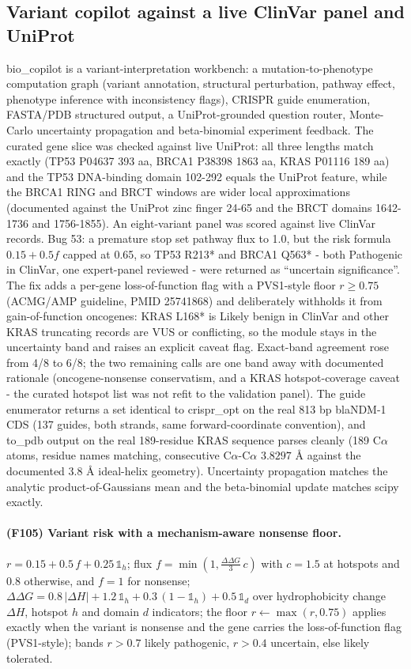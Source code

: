 \subsection{Variant copilot against a live ClinVar panel and UniProt}
bio\_copilot is a variant-interpretation workbench: a mutation-to-phenotype computation graph (variant annotation, structural perturbation, pathway effect, phenotype inference with inconsistency flags), CRISPR guide enumeration, FASTA/PDB structured output, a UniProt-grounded question router, Monte-Carlo uncertainty propagation and beta-binomial experiment feedback. The curated gene slice was checked against live UniProt: all three lengths match exactly (TP53 P04637 393 aa, BRCA1 P38398 1863 aa, KRAS P01116 189 aa) and the TP53 DNA-binding domain 102-292 equals the UniProt feature, while the BRCA1 RING and BRCT windows are wider local approximations (documented against the UniProt zinc finger 24-65 and the BRCT domains 1642-1736 and 1756-1855). An eight-variant panel was scored against live ClinVar records. Bug 53: a premature stop set pathway flux to 1.0, but the risk formula $0.15+0.5f$ capped at 0.65, so TP53 R213* and BRCA1 Q563* - both Pathogenic in ClinVar, one expert-panel reviewed - were returned as ``uncertain significance''. The fix adds a per-gene loss-of-function flag with a PVS1-style floor $r\ge0.75$ (ACMG/AMP guideline, PMID 25741868) and deliberately withholds it from gain-of-function oncogenes: KRAS L168* is Likely benign in ClinVar and other KRAS truncating records are VUS or conflicting, so the module stays in the uncertainty band and raises an explicit caveat flag. Exact-band agreement rose from 4/8 to 6/8; the two remaining calls are one band away with documented rationale (oncogene-nonsense conservatism, and a KRAS hotspot-coverage caveat - the curated hotspot list was not refit to the validation panel). The guide enumerator returns a set identical to crispr\_opt on the real 813 bp blaNDM-1 CDS (137 guides, both strands, same forward-coordinate convention), and to\_pdb output on the real 189-residue KRAS sequence parses cleanly (189 C$\alpha$ atoms, residue names matching, consecutive C$\alpha$-C$\alpha$ $3.8297$ \AA{} against the documented 3.8 \AA{} ideal-helix geometry). Uncertainty propagation matches the analytic product-of-Gaussians mean and the beta-binomial update matches scipy exactly.
\paragraph{(F105) Variant risk with a mechanism-aware nonsense floor.} $r=0.15+0.5\,f+0.25\,\mathbb{1}_{h}$; flux $f=\min(1,\frac{\Delta\Delta G}{3}\,c)$ with $c=1.5$ at hotspots and $0.8$ otherwise, and $f=1$ for nonsense; $\Delta\Delta G=0.8\,|\Delta H|+1.2\,\mathbb{1}_{h}+0.3\,(1-\mathbb{1}_{h})+0.5\,\mathbb{1}_{d}$ over hydrophobicity change $\Delta H$, hotspot $h$ and domain $d$ indicators; the floor $r\leftarrow\max(r,0.75)$ applies exactly when the variant is nonsense and the gene carries the loss-of-function flag (PVS1-style); bands $r>0.7$ likely pathogenic, $r>0.4$ uncertain, else likely tolerated.
